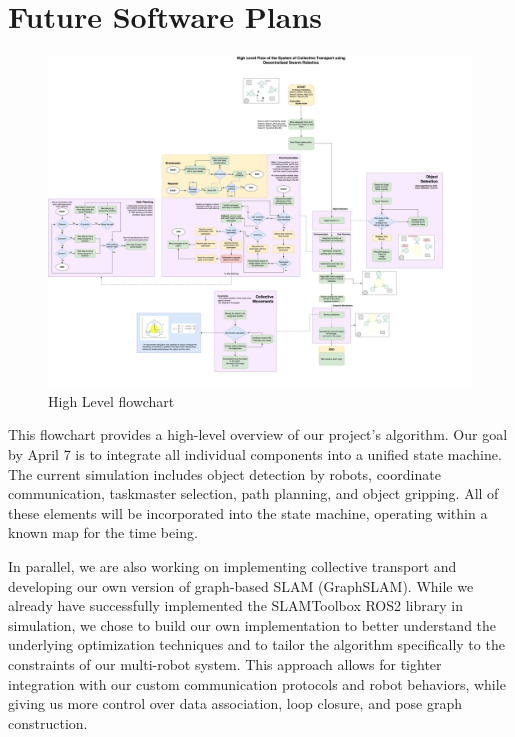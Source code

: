 \chapter{Future Software Plans}
\begin{figure}[H]
    \centering
    \includegraphics[width=1\linewidth, angle=-90]          {assets/images/future_software_plans/Flow7AprilCompromise.drawio (1).png}
    \caption{High Level flowchart}
    \label{fig:gantt_chart}
\end{figure}

\newpage
This flowchart provides a high-level overview of our project’s algorithm. Our goal by April 7 is to integrate all individual components into a unified state machine. The current simulation includes object detection by robots, coordinate communication, taskmaster selection, path planning, and object gripping. All of these elements will be incorporated into the state machine, operating within a known map for the time being.


\vspace{\baselineskip}
In parallel, we are also working on implementing collective transport and developing our own version of graph-based SLAM (GraphSLAM). While we already have successfully implemented the SLAMToolbox ROS2 library in simulation, we chose to build our own implementation to better understand the underlying optimization techniques and to tailor the algorithm specifically to the constraints of our multi-robot system. This approach allows for tighter integration with our custom communication protocols and robot behaviors, while giving us more control over data association, loop closure, and pose graph construction.